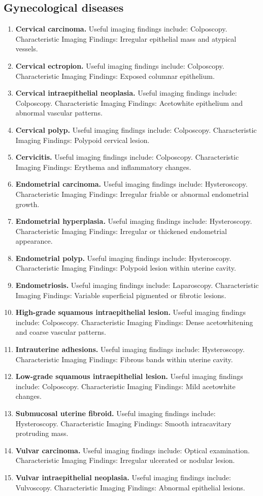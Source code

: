 \subsection{Gynecological diseases}
\begin{enumerate}[leftmargin=*,itemsep=0.45em,topsep=0.4em]
\item \textbf{Cervical carcinoma.} Useful imaging findings include: Colposcopy. Characteristic Imaging Findings: Irregular epithelial mass and atypical vessels.
\item \textbf{Cervical ectropion.} Useful imaging findings include: Colposcopy. Characteristic Imaging Findings: Exposed columnar epithelium.
\item \textbf{Cervical intraepithelial neoplasia.} Useful imaging findings include: Colposcopy. Characteristic Imaging Findings: Acetowhite epithelium and abnormal vascular patterns.
\item \textbf{Cervical polyp.} Useful imaging findings include: Colposcopy. Characteristic Imaging Findings: Polypoid cervical lesion.
\item \textbf{Cervicitis.} Useful imaging findings include: Colposcopy. Characteristic Imaging Findings: Erythema and inflammatory changes.
\item \textbf{Endometrial carcinoma.} Useful imaging findings include: Hysteroscopy. Characteristic Imaging Findings: Irregular friable or abnormal endometrial growth.
\item \textbf{Endometrial hyperplasia.} Useful imaging findings include: Hysteroscopy. Characteristic Imaging Findings: Irregular or thickened endometrial appearance.
\item \textbf{Endometrial polyp.} Useful imaging findings include: Hysteroscopy. Characteristic Imaging Findings: Polypoid lesion within uterine cavity.
\item \textbf{Endometriosis.} Useful imaging findings include: Laparoscopy. Characteristic Imaging Findings: Variable superficial pigmented or fibrotic lesions.
\item \textbf{High-grade squamous intraepithelial lesion.} Useful imaging findings include: Colposcopy. Characteristic Imaging Findings: Dense acetowhitening and coarse vascular patterns.
\item \textbf{Intrauterine adhesions.} Useful imaging findings include: Hysteroscopy. Characteristic Imaging Findings: Fibrous bands within uterine cavity.
\item \textbf{Low-grade squamous intraepithelial lesion.} Useful imaging findings include: Colposcopy. Characteristic Imaging Findings: Mild acetowhite changes.
\item \textbf{Submucosal uterine fibroid.} Useful imaging findings include: Hysteroscopy. Characteristic Imaging Findings: Smooth intracavitary protruding mass.
\item \textbf{Vulvar carcinoma.} Useful imaging findings include: Optical examination. Characteristic Imaging Findings: Irregular ulcerated or nodular lesion.
\item \textbf{Vulvar intraepithelial neoplasia.} Useful imaging findings include: Vulvoscopy. Characteristic Imaging Findings: Abnormal epithelial lesions.
\end{enumerate}

